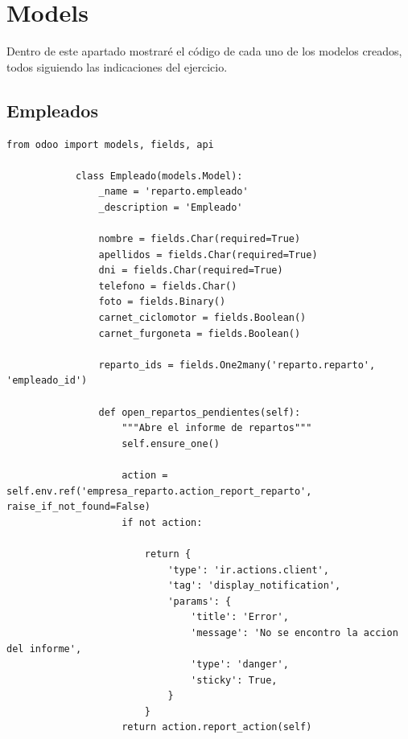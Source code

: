 \documentclass[a4paper, 11pt]{article}
\begin{document}
\section{Models}
Dentro de este apartado mostraré el código de cada uno de los modelos creados, todos siguiendo las indicaciones del ejercicio.
    \subsection{Empleados}
        \begin{lstlisting}[frame=single,breaklines=true]
            from odoo import models, fields, api

            class Empleado(models.Model):
                _name = 'reparto.empleado'
                _description = 'Empleado'

                nombre = fields.Char(required=True)
                apellidos = fields.Char(required=True)
                dni = fields.Char(required=True)
                telefono = fields.Char()
                foto = fields.Binary()
                carnet_ciclomotor = fields.Boolean()
                carnet_furgoneta = fields.Boolean()

                reparto_ids = fields.One2many('reparto.reparto', 'empleado_id')

                def open_repartos_pendientes(self):
                    """Abre el informe de repartos"""
                    self.ensure_one()

                    action = self.env.ref('empresa_reparto.action_report_reparto', raise_if_not_found=False)
                    if not action:

                        return {
                            'type': 'ir.actions.client',
                            'tag': 'display_notification',
                            'params': {
                                'title': 'Error',
                                'message': 'No se encontro la accion del informe',
                                'type': 'danger',
                                'sticky': True,
                            }
                        }
                    return action.report_action(self)
        \end{lstlisting}
\end{document}
